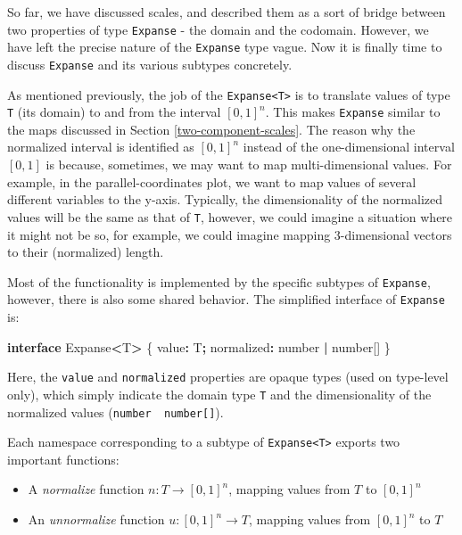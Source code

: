 \documentclass[
]{book}
\newenvironment{Shaded}{\begin{snugshade}}{\end{snugshade}}
\newcommand{\DataTypeTok}[1]{\textcolor[rgb]{0.13,0.29,0.53}{#1}}
\newcommand{\KeywordTok}[1]{\textcolor[rgb]{0.13,0.29,0.53}{\textbf{#1}}}
\newcommand{\NormalTok}[1]{#1}
\newcommand{\OperatorTok}[1]{\textcolor[rgb]{0.81,0.36,0.00}{\textbf{#1}}}
\providecommand{\tightlist}{%
  \setlength{\itemsep}{0pt}\setlength{\parskip}{0pt}}
\theoremstyle{definition}
\theoremstyle{definition}
\theoremstyle{definition}
\theoremstyle{definition}
\theoremstyle{remark}
\begin{document}
So far, we have discussed scales, and described them as a sort of bridge between two properties of type \texttt{Expanse} - the domain and the codomain. However, we have left the precise nature of the \texttt{Expanse} type vague. Now it is finally time to discuss \texttt{Expanse} and its various subtypes concretely.

As mentioned previously, the job of the \texttt{Expanse\textless{}T\textgreater{}} is to translate values of type \texttt{T} (its domain) to and from the interval \([0, 1]^n\). This makes \texttt{Expanse} similar to the maps discussed in Section \ref{two-component-scales}. The reason why the normalized interval is identified as \([0, 1]^n\) instead of the one-dimensional interval \([0, 1]\) is because, sometimes, we may want to map multi-dimensional values. For example, in the parallel-coordinates plot, we want to map values of several different variables to the y-axis. Typically, the dimensionality of the normalized values will be the same as that of \texttt{T}, however, we could imagine a situation where it might not be so, for example, we could imagine mapping 3-dimensional vectors to their (normalized) length.

Most of the functionality is implemented by the specific subtypes of \texttt{Expanse}, however, there is also some shared behavior. The simplified interface of \texttt{Expanse} is:

\begin{Shaded}
\begin{Highlighting}[]
\KeywordTok{interface}\NormalTok{ Expanse}\OperatorTok{\textless{}}\NormalTok{T}\OperatorTok{\textgreater{}}\NormalTok{ \{}
\NormalTok{  value}\OperatorTok{:}\NormalTok{ T}\OperatorTok{;}
\NormalTok{  normalized}\OperatorTok{:} \DataTypeTok{number} \OperatorTok{|} \DataTypeTok{number}\NormalTok{[]}
\NormalTok{\}}
\end{Highlighting}
\end{Shaded}

Here, the \texttt{value} and \texttt{normalized} properties are opaque types (used on type-level only), which simply indicate the domain type \texttt{T} and the dimensionality of the normalized values (\texttt{number\ \textbar{}\ number{[}{]}}).

Each namespace corresponding to a subtype of \texttt{Expanse\textless{}T\textgreater{}} exports two important functions:

\begin{itemize}
\tightlist
\item
  A \emph{normalize} function \(n: T \to [0, 1]^n\), mapping values from \(T\) to \([0, 1]^n\)
\item
  An \emph{unnormalize} function \(u: [0, 1]^n \to T\), mapping values from \([0, 1]^n\) to \(T\)
\end{itemize}
\end{document}
